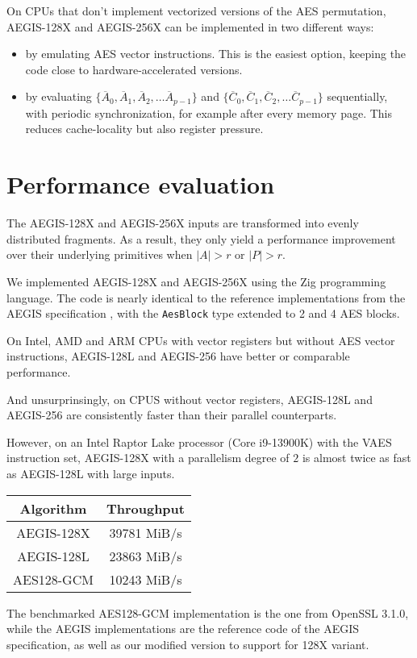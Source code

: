 \documentclass[envcountsame,runningheads,notitlepage]{llncs}
\begin{document}
On CPUs that don't implement vectorized versions of the AES permutation, AEGIS-128X and AEGIS-256X can be implemented in two different ways:

\begin{itemize}
  \item by emulating AES vector instructions. This is the easiest option, keeping the code close to hardware-accelerated versions.
  \item by evaluating $\{ \overline{A}_0, \overline{A}_1, \overline{A}_2, \ldots \overline{A}_{p-1} \}$ and $\{ \overline{C}_0, \overline{C}_1, \overline{C}_2, \ldots \overline{C}_{p-1} \}$ sequentially, with periodic synchronization, for example after every memory page. This reduces cache-locality but also register pressure.
\end{itemize}

\section{Performance evaluation}
\label{sec:performance evaluation}

The AEGIS-128X and AEGIS-256X inputs are transformed into evenly distributed fragments.
As a result, they only yield a performance improvement over their underlying primitives when $\lvert A \rvert > r$ or $\lvert P \rvert > r$.

We implemented AEGIS-128X and AEGIS-256X using the Zig programming language. The code is nearly identical to the reference implementations from the AEGIS specification \cite{DSL2023}, with the \lstinline{AesBlock} type extended to 2 and 4 AES blocks.

On Intel, AMD and ARM CPUs with vector registers but without AES vector instructions, AEGIS-128L and AEGIS-256 have better or comparable performance.

And unsurprinsingly, on CPUS without vector registers, AEGIS-128L and AEGIS-256 are consistently faster than their parallel counterparts.

However, on an Intel Raptor Lake processor (Core i9-13900K) with the VAES instruction set, AEGIS-128X with a parallelism degree of $2$ is almost twice as fast as AEGIS-128L with large inputs.

\begin{center}
  \begin{tabular}{|c|c|}
    \hline
    Algorithm  & Throughput  \\
    \hline
    AEGIS-128X & 39781 MiB/s \\
    \hline
    AEGIS-128L & 23863 MiB/s \\
    \hline
    AES128-GCM & 10243 MiB/s \\
    \hline
  \end{tabular}
\end{center}

The benchmarked AES128-GCM implementation is the one from OpenSSL 3.1.0, while the AEGIS implementations are the reference code of the AEGIS specification, as well as our modified version to support for 128X variant.

\ifnum{}
  
\else
  
\fi

\end{document}
